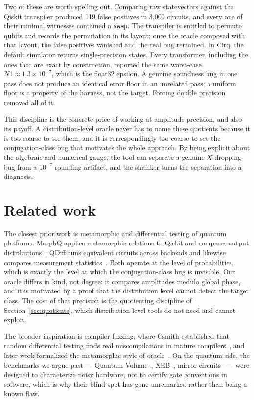 \documentclass[11pt]{article}
\begin{document}
Two of these are worth spelling out. Comparing raw statevectors against
the Qiskit transpiler produced 119 false positives in 3{,}000 circuits,
and every one of their minimal witnesses contained a \texttt{swap}. The
transpiler is entitled to permute qubits and records the permutation in
its layout; once the oracle composed with that layout, the false
positives vanished and the real bug remained. In Cirq, the default
simulator returns single-precision states. Every transformer, including
the ones that are exact by construction, reported the same worst-case
$N1 \approx 1.3 \times 10^{-7}$, which is the float32 epsilon. A genuine
soundness bug in one pass does not produce an identical error floor in an
unrelated pass; a uniform floor is a property of the harness, not the
target. Forcing double precision removed all of it.

This discipline is the concrete price of working at amplitude precision,
and also its payoff. A distribution-level oracle never has to name these
quotients because it is too coarse to see them, and it is correspondingly
too coarse to see the conjugation-class bug that motivates the whole
approach. By being explicit about the algebraic and numerical gauge, the
tool can separate a genuine $X$-dropping bug from a $10^{-7}$ rounding
artifact, and the shrinker turns the separation into a diagnosis.

\section{Related work}

The closest prior work is metamorphic and differential testing of quantum
platforms. MorphQ applies metamorphic relations to Qiskit and compares
output distributions~\cite{morphq}; QDiff runs equivalent circuits across
backends and likewise compares measurement statistics~\cite{qdiff}. Both
operate at the level of probabilities, which is exactly the level at
which the conjugation-class bug is invisible. Our oracle differs in
kind, not degree: it compares amplitudes modulo global phase, and it is
motivated by a proof that the distribution level cannot detect the target
class. The cost of that precision is the quotienting discipline of
Section~\ref{sec:quotients}, which distribution-level tools do not need
and cannot exploit.

The broader inspiration is compiler fuzzing, where Csmith established that
random differential testing finds real miscompilations in mature
compilers~\cite{csmith}, and later work formalized the metamorphic style
of oracle~\cite{metamorphic}. On the quantum side, the benchmarks we
argue past --- Quantum Volume~\cite{cross2019}, XEB~\cite{arute2019},
mirror circuits~\cite{proctor2022} --- were designed to characterize
noisy hardware, not to certify gate conventions in software, which is
why their blind spot has gone unremarked rather than being a known flaw.
\end{document}
